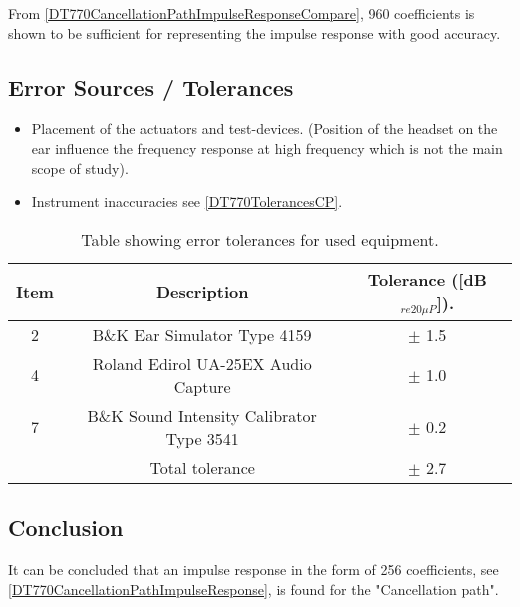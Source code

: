 From \autoref{DT770CancellationPathImpulseResponseCompare}, 960 coefficients is shown to be sufficient for representing the impulse response with good accuracy. 

\subsection{Error Sources / Tolerances}
\begin{itemize}
	\item Placement of the actuators and test-devices. (Position of the headset on the ear  influence the frequency response at high frequency which is not the main scope of study).
	\item Instrument inaccuracies see \autoref{DT770TolerancesCP}.
\end{itemize}

\begin{table}[H]
	\centering
	\begin{tabular}{ c c c } \toprule
		{Item}	& 		{Description} 	& {Tolerance ([dB$_{re20\mu P}$])}.	 \\ \bottomrule 
		2	&	B\&K Ear Simulator Type 4159				& $\pm$ 1.5 	\\
		4	&	Roland Edirol UA-25EX Audio Capture			& $\pm$ 1.0\\
		7	&	B\&K Sound Intensity Calibrator Type 3541	& $\pm$ 0.2	\\ \bottomrule
			&	Total tolerance								& $\pm$ 2.7	\\ \bottomrule	
	\end{tabular}
	\caption{Table showing error tolerances for used equipment.}
	\label{DT770TolerancesCP}
\end{table}

\subsection{Conclusion}
It can be concluded that an impulse response in the form of 256 coefficients, see \autoref{DT770CancellationPathImpulseResponse}, is found for the "Cancellation path".
